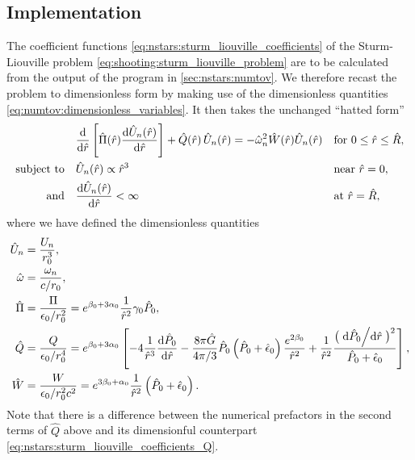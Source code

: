 \subsection*{Implementation}

The coefficient functions \eqref{eq:nstars:sturm_liouville_coefficients} of the Sturm-Liouville problem \eqref{eq:shooting:sturm_liouville_problem} are to be calculated from the output of the program in \cref{sec:nstars:numtov}.
We therefore recast the problem to dimensionless form by making use of the dimensionless quantities \eqref{eq:numtov:dimensionless_variables}.
It then takes the unchanged ``hatted form''
\begin{subequations}
\begin{align}
	&\odv*{ \left[ \hat{\Pi}(\hat{r}) \odv{\hat{U}_n(\hat{r})}{\hat{r}} \right] }{\hat{r}} + \hat{Q}(\hat{r}) \, \hat{U}_n(\hat{r}) = -\hat{\omega}_n^2 \hat{W}(\hat{r}) \hat{U}_n(\hat{r}) && \text{for } 0 \leq \hat{r} \leq \hat{R} , \label{eq:shooting:sturm_liouville_diffeq_dimless} \\
	\text{subject to} \quad & \hat{U}_n(\hat{r})          \propto \hat{r}^3    && \text{near } \hat{r}=0 , \label{eq:shooting:sturm_liouville_bc1_dimless} \\
	\text{and}        \quad & \odv{\hat{U}_n(\hat{r})}{\hat{r}} <       \infty && \text{at } \hat{r}=\hat{R} \label{eq:shooting:sturm_liouville_bc2_dimless} ,
\end{align}%
\label{eq:shooting:sturm_liouville_problem_dimless}%
\end{subequations}%
where we have defined the dimensionless quantities
\begin{subequations}
\begin{align}
	\hat{U}_n    &= \frac{U_n}{r_0^3} , \\ 
	\hat{\omega} &= \frac{\omega_n}{c/r_0} , \\ 
	\hat{\Pi}    &= \frac{\Pi}{\epsilon_0 / r_0^2}   = e^{\beta_0 + 3 \alpha_0} \frac{1}{\hat{r}^2} \gamma_0 \hat{P}_0 , \\
	\hat{Q}      &= \frac{Q}{\epsilon_0 / r_0^4}     = e^{\beta_0 + 3 \alpha_0} \left[ -4 \frac{1}{\hat{r}^3} \odv{\hat{P}_0}{\hat{r}} - \frac{8 \pi \hat{G}}{4 \pi / 3} \hat{P}_0 \left( \hat{P}_0 + \hat{\epsilon}_0 \right) \frac{e^{2 \beta_0}}{\hat{r}^2} + \frac{1}{\hat{r}^2} \frac{\big( \odv{\hat{P}_0}/{\hat{r}} \big)^2}{\hat{P}_0 + \hat{\epsilon}_0} \right] , \\
	\hat{W}      &= \frac{W}{\epsilon_0 / r_0^2 c^2} = e^{3 \beta_0 + \alpha_0} \frac{1}{\hat{r}^2} \left( \hat{P}_0 + \hat{\epsilon}_0 \right) .
\end{align}%
\label{eq:shooting:dimensionless_variables}%
\end{subequations}%
Note that there is a difference between the numerical prefactors in the second terms of $\hat{Q}$ above and its dimensionful counterpart \eqref{eq:nstars:sturm_liouville_coefficients_Q}.

